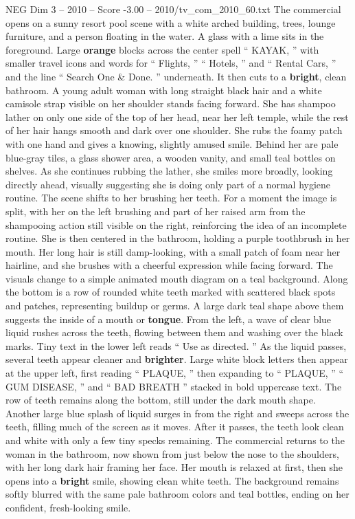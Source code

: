 \begin{textsample}{NEG Dim 3 – 2010 – Score -3.00 – 2010/tv\_com\_2010\_60.txt}  \label{ex:f3_neg_005}
The commercial opens on a sunny resort pool scene with a white arched building, trees, lounge furniture, and a person floating in the water.
A glass with a lime sits in the foreground.
Large \textbf{orange} blocks across the center spell “ KAYAK, ” with smaller travel icons and words for “ Flights, ” “ Hotels, ” and “ Rental Cars, ” and the line “ Search One \& Done. ” underneath.
It then cuts to a \textbf{bright}, clean bathroom.
A young adult woman with long straight black hair and a white camisole strap visible on her shoulder stands facing forward.
She has shampoo lather on only one side of the top of her head, near her left temple, while the rest of her hair hangs smooth and dark over one shoulder.
She rubs the foamy patch with one hand and gives a knowing, slightly amused smile.
Behind her are pale blue-gray tiles, a glass shower area, a wooden vanity, and small teal bottles on shelves.
As she continues rubbing the lather, she smiles more broadly, looking directly ahead, visually suggesting she is doing only part of a normal hygiene routine.
The scene shifts to her brushing her teeth.
For a moment the image is split, with her on the left brushing and part of her raised arm from the shampooing action still visible on the right, reinforcing the idea of an incomplete routine.
She is then centered in the bathroom, holding a purple toothbrush in her mouth.
Her long hair is still damp-looking, with a small patch of foam near her hairline, and she brushes with a cheerful expression while facing forward.
The visuals change to a simple animated mouth diagram on a teal background.
Along the bottom is a row of rounded white teeth marked with scattered black spots and patches, representing buildup or germs.
A large dark teal shape above them suggests the inside of a mouth or \textbf{tongue}.
From the left, a wave of clear blue liquid rushes across the teeth, flowing between them and washing over the black marks.
Tiny text in the lower left reads “ Use as directed. ” As the liquid passes, several teeth appear cleaner and \textbf{brighter}.
Large white block letters then appear at the upper left, first reading “ PLAQUE, ” then expanding to “ PLAQUE, ” “ GUM DISEASE, ” and “ BAD BREATH ” stacked in bold uppercase text.
The row of teeth remains along the bottom, still under the dark mouth shape.
Another large blue splash of liquid surges in from the right and sweeps across the teeth, filling much of the screen as it moves.
After it passes, the teeth look clean and white with only a few tiny specks remaining.
The commercial returns to the woman in the bathroom, now shown from just below the nose to the shoulders, with her long dark hair framing her face.
Her mouth is relaxed at first, then she opens into a \textbf{bright} smile, showing clean white teeth.
The background remains softly blurred with the same pale bathroom colors and teal bottles, ending on her confident, fresh-looking smile.

\end{textsample}
